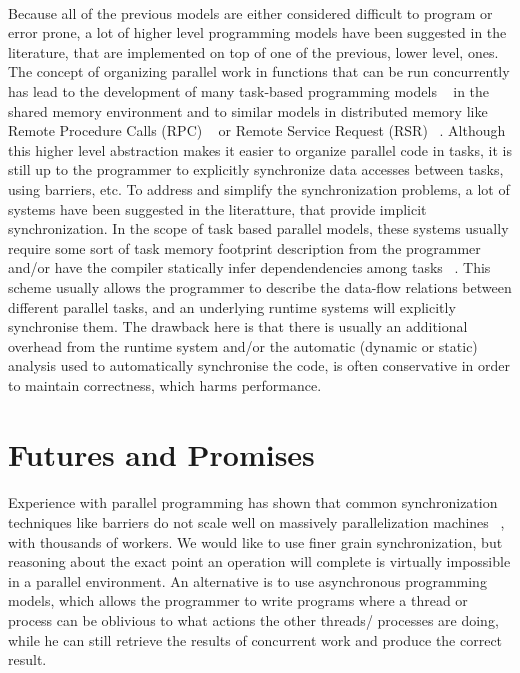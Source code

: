 \paragraph{}
Because all of the previous models are either considered difficult to program or error prone, a lot of higher 
level programming models have been suggested in the literature, that are implemented on top of one of the 
previous, lower level, ones.  The concept of organizing parallel work in functions that can be run
concurrently has lead to the development of many task-based programming models
~\cite{Ayguade:2009:DOT:1512157.1512430, Blumofe95cilk:an} in the shared memory
environment and to similar models in distributed memory like Remote Procedure Calls (RPC)
~\cite{Saunders:2003:AAP:966049.781534,Beckman96tulip:a,Vadhiyar03gradsolve-}
or Remote Service Request (RSR) ~\cite{Foster96thenexus}.  Although this higher level
abstraction makes it easier to organize parallel code in tasks, it is still up to the 
programmer to explicitly synchronize data accesses between tasks, using barriers, etc.
To address and simplify the synchronization problems, a lot of systems have been suggested
in the literatture, that provide implicit synchronization.  In the scope of task based parallel
models, these systems usually require some sort of task memory footprint description from the 
programmer~\cite{Tzenakis:2012:BBD:2370036.2145864, Perez:2010:HTD:1810085.1810122}
and/or have the compiler statically infer dependendencies among tasks 
~\cite{Jenista:2011:OSO:1941553.1941563, Zakkak:2012:IDI:2370816.2370892}.
This scheme usually allows the programmer to describe the data-flow relations between different
parallel tasks, and an underlying runtime systems will explicitly synchronise them.  The drawback
here is that there is usually an additional overhead from the runtime system and/or the automatic
(dynamic or static) analysis used to automatically synchronise the code, is often conservative
in order to maintain correctness, which harms performance.

\section{Futures and Promises}
\label{sect:futures-promises}

\paragraph{}
Experience with parallel programming has shown that common synchronization techniques like
barriers do not scale well on massively parallelization machines ~\cite{4100352}, with thousands of workers.
We would like to use finer grain synchronization, but reasoning about the exact point an operation will complete
is virtually impossible in a parallel environment.  An alternative is to use asynchronous programming models, which
allows the programmer to write programs where a thread or process can be oblivious to what actions the other threads/
processes are doing, while he can still retrieve the results of concurrent work and produce the correct result.

